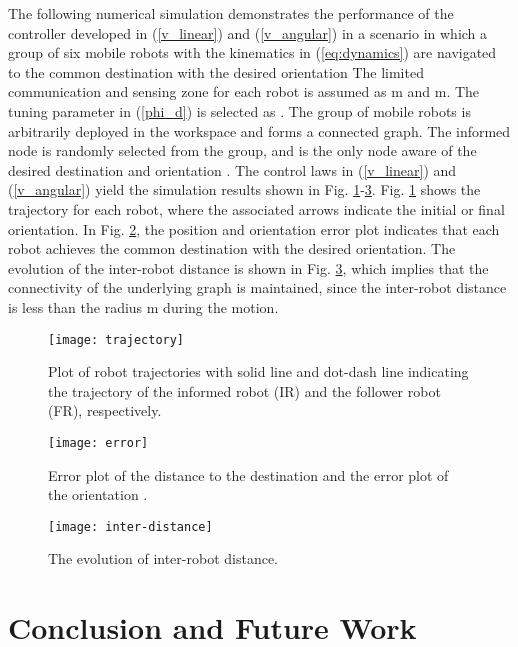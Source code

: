 \documentclass[english]{IOS-Book-Article}
\theoremstyle{definition}
\theoremstyle{definition}
\begin{document}
The following numerical simulation demonstrates the performance of
the controller developed in (\ref{v_linear}) and (\ref{v_angular})
in a scenario in which a group of six mobile robots with the kinematics
in (\ref{eq:dynamics}) are navigated to the common destination  with the desired orientation  The limited communication
and sensing zone for each robot is assumed as  m and 
m. The tuning parameter  in (\ref{phi_d}) is selected as
. The group of mobile robots is arbitrarily deployed
in the workspace and forms a connected graph. The informed node is
randomly selected from the group, and is the only node aware of the
desired destination  and orientation .
The control laws in (\ref{v_linear}) and (\ref{v_angular}) yield
the simulation results shown in Fig. \ref{fig:trajectory}-\ref{fig:dis}.
Fig. \ref{fig:trajectory} shows the trajectory for each robot, where
the associated arrows indicate the initial or final orientation. In
Fig. \ref{fig:error}, the position and orientation error plot indicates
that each robot achieves the common destination with the desired orientation.
The evolution of the inter-robot distance is shown in Fig. \ref{fig:dis},
which implies that the connectivity of the underlying graph is maintained,
since the inter-robot distance is less than the radius  m during
the motion.

\begin{figure}
\centering{}\texttt{[image: trajectory]}

\caption{Plot of robot trajectories with solid line and dot-dash line indicating
the trajectory of the informed robot (IR) and the follower robot (FR),
respectively.}


\label{fig:trajectory}
\end{figure}
\begin{figure}
\centering{}\texttt{[image: error]}

\caption{Error plot of the distance to the destination and the error plot of
the orientation .}


\label{fig:error}
\end{figure}
\begin{figure}
\centering{}\texttt{[image: inter-distance]}

\caption{The evolution of inter-robot distance.}


\label{fig:dis}
\end{figure}



\section{Conclusion and Future Work}
\end{document}

